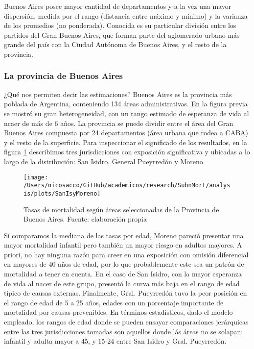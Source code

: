 \documentclass[12pt,]{article}
\begin{document}
Buenos Aires posee mayor cantidad de departamentos y a la vez una mayor
dispersión, medida por el rango (distancia entre máximo y mínimo) y la
varianza de los promedios (no ponderada). Conocida es su particular
división entre los partidos del Gran Buenos Aires, que forman parte del
aglomerado urbano más grande del país con la Ciudad Autónoma de Buenos
Aires, y el resto de la provincia.

\hypertarget{la-provincia-de-buenos-aires}{%
\subsubsection{La provincia de Buenos
Aires}\label{la-provincia-de-buenos-aires}}

¿Qué nos permiten decir las estimaciones? Buenos Aires es la provincia
más poblada de Argentina, conteniendo 134 áreas administrativas. En la
figura previa se mostró su gran heterogeneidad, con un rango estimado de
esperanza de vida al ncaer de más de 6 años. La provincia se puede
dividir entre el área del Gran Buenos Aires compuesta por 24
departamentos (área urbana que rodea a CABA) y el resto de la
superficie. Para inspeccionar el significado de los resultados, en la
figura \ref{fig:dptosBsAs} describimos tres jurisdicciones con
exposición significativa y ubicadas a lo largo de la distribución: San
Isidro, General Pueyrredón y Moreno

\begin{figure}

{\centering \texttt{[image: /Users/nicosacco/GitHub/academicos/research/SubnMort/analysis/plots/SanIsyMoreno]} 

}

\caption{Tasas de mortalidad según áreas seleccionadas de la Provincia de Buenos Aires. Fuente: elaboración propia}\label{fig:dptosBsAs}
\end{figure}

Si comparamos la mediana de las tasas por edad, Moreno pareció presentar
una mayor mortalidad infantil pero también un mayor riesgo en adultos
mayores. A priori, no hay ninguna razón para creer en una exposición con
omisión diferencial en mayores de 40 años de edad, por lo que
probablemente este sea un patrón de mortalidad a tener en cuenta. En el
caso de San Isidro, con la mayor esperanza de vida al nacer de este
grupo, presentó la curva más baja en el rango de edad típico de causas
externas. Finalmente, Gral. Pueyrredón tuvo la peor posición en el rango
de edad de 5 a 25 años, edades con un porcentaje importante de
mortalidad por causas prevenibles. En términos estadísticos, dado el
modelo empleado, los rangos de edad donde se pueden ensayar
comparaciones jerárquicas entre las tres jurisdicciones tomadas son
aquellos donde lás áreas no se solapan: infantil y adulta mayor a 45, y
15-24 entre San Isidro y Gral. Pueyrredón.
\end{document}
